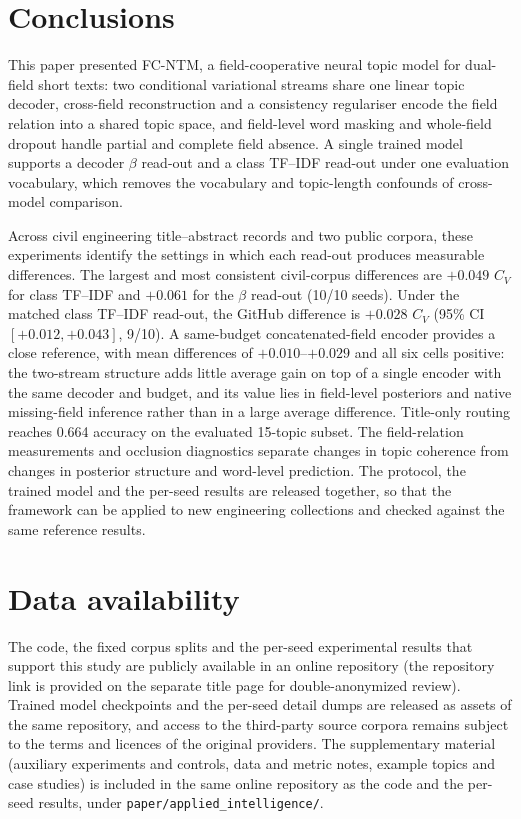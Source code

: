 \documentclass[pdflatex,sn-basic]{sn-jnl}
\newcommand{\fcntm}{FC-NTM}
\begin{document}
\section{Conclusions}
\label{sec:conclusions}

This paper presented \fcntm{}, a field-cooperative neural topic model for dual-field short texts:
two conditional variational streams share one linear topic decoder, cross-field reconstruction
and a consistency regulariser encode the field relation into a shared topic space, and
field-level word masking and whole-field dropout handle partial and complete field absence. A
single trained model supports a decoder $\beta$ read-out and a class TF--IDF read-out under one
evaluation vocabulary, which removes the vocabulary and topic-length confounds of cross-model
comparison.

Across civil engineering title--abstract records and two public corpora, these experiments identify
the settings in which each read-out produces measurable differences. The largest and most consistent
civil-corpus differences are $+0.049$ $C_V$ for class TF--IDF and $+0.061$ for the $\beta$ read-out
(10/10 seeds). Under the matched class TF--IDF read-out, the GitHub difference is $+0.028$ $C_V$
(95\% CI $[+0.012,+0.043]$, 9/10). A same-budget concatenated-field encoder provides a close
reference, with mean differences of $+0.010$--$+0.029$ and all six cells positive: the
two-stream structure adds little average gain on top of a single encoder with the same decoder
and budget, and its value lies in field-level posteriors and native missing-field inference
rather than in a large average difference. Title-only
routing reaches 0.664 accuracy on the evaluated 15-topic subset. The field-relation measurements
and occlusion diagnostics separate changes in topic coherence from changes in posterior structure
and word-level prediction. The protocol, the trained model and the per-seed results are released
together, so that the framework can be applied to new engineering collections and checked against
the same reference results.

\section*{Data availability}
The code, the fixed corpus splits and the per-seed experimental results that support this study
are publicly available in an online repository (the repository link is provided on the separate
title page for double-anonymized review). Trained model checkpoints and the per-seed detail dumps
are released as assets of the same repository, and access to the third-party source corpora
remains subject to the terms and licences of the original providers. The supplementary material
(auxiliary experiments and controls, data and metric notes, example topics and case studies) is
included in the same online repository as the code and the per-seed results, under
\texttt{paper/applied\_intelligence/}.
\end{document}
